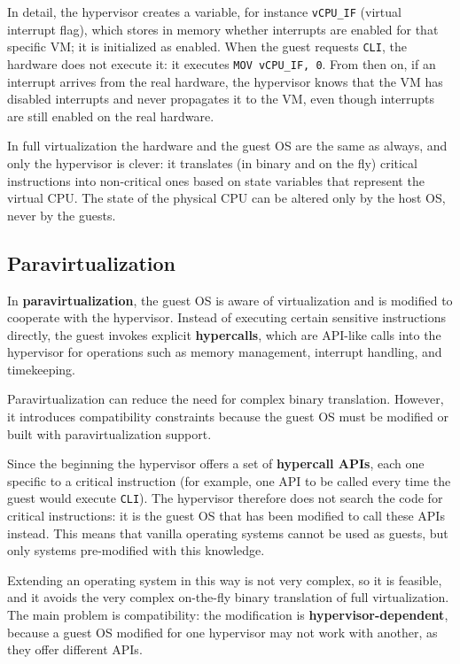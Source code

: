 In detail, the hypervisor creates a variable, for instance \texttt{vCPU\_IF} (virtual interrupt flag), which stores in memory whether interrupts are enabled for that specific VM; it is initialized as enabled. When the guest requests \texttt{CLI}, the hardware does not execute it: it executes \texttt{MOV vCPU\_IF, 0}. From then on, if an interrupt arrives from the real hardware, the hypervisor knows that the VM has disabled interrupts and never propagates it to the VM, even though interrupts are still enabled on the real hardware.

In full virtualization the hardware and the guest OS are the same as always, and only the hypervisor is clever: it translates (in binary and on the fly) critical instructions into non-critical ones based on state variables that represent the virtual CPU. The state of the physical CPU can be altered only by the host OS, never by the guests.

\begin{center}
\end{center}

\subsection{Paravirtualization}

In \textbf{paravirtualization}, the guest OS is aware of virtualization and is modified to cooperate with the hypervisor. Instead of executing certain sensitive instructions directly, the guest invokes explicit \textbf{hypercalls}, which are API-like calls into the hypervisor for operations such as memory management, interrupt handling, and timekeeping.

Paravirtualization can reduce the need for complex binary translation. However, it introduces compatibility constraints because the guest OS must be modified or built with paravirtualization support.

Since the beginning the hypervisor offers a set of \textbf{hypercall APIs}, each one specific to a critical instruction (for example, one API to be called every time the guest would execute \texttt{CLI}). The hypervisor therefore does not search the code for critical instructions: it is the guest OS that has been modified to call these APIs instead. This means that vanilla operating systems cannot be used as guests, but only systems pre-modified with this knowledge.

Extending an operating system in this way is not very complex, so it is feasible, and it avoids the very complex on-the-fly binary translation of full virtualization. The main problem is compatibility: the modification is \textbf{hypervisor-dependent}, because a guest OS modified for one hypervisor may not work with another, as they offer different APIs.

